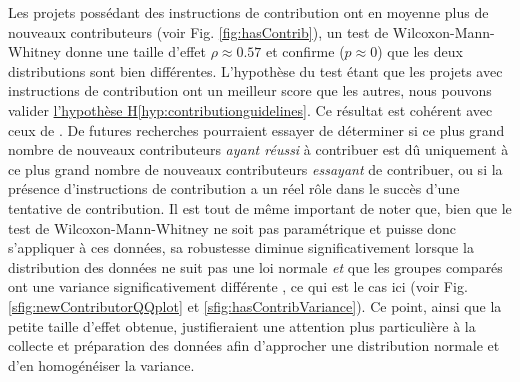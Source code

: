 \documentclass[dvipsnames,runningheads]{llncs}
\begin{document}
    Les projets possédant des instructions de contribution ont en moyenne plus de nouveaux contributeurs (voir
    Fig. \ref{fig:hasContrib}), un test de Wilcoxon-Mann-Whitney donne une taille d'effet $\rho \approx 0.57$
    et confirme ($p \approx 0$) que les deux distributions sont bien différentes. L'hypothèse du test étant
    que les projets avec instructions de contribution ont un meilleur score que les autres, nous pouvons
    valider \hyperref[hyp:contributionguidelines]{l'hypothèse H\ref*{hyp:contributionguidelines}}. Ce résultat
    est cohérent avec ceux de \textcite[p.~11]{signals-2019}. De futures recherches pourraient essayer de
    déterminer si ce plus grand nombre de nouveaux contributeurs \emph{ayant réussi} à contribuer est dû
    uniquement à ce plus grand nombre de nouveaux contributeurs \emph{essayant} de contribuer, ou si la
    présence d'instructions de contribution a un réel rôle dans le succès d'une tentative de contribution. Il
    est tout de même important de noter que, bien que le test de Wilcoxon-Mann-Whitney ne soit pas
    paramétrique et puisse donc s'appliquer à ces données, sa robustesse diminue significativement lorsque la
    distribution des données ne suit pas une loi normale \emph{et} que les groupes comparés ont une variance
    significativement différente \parencite{WMW-robustness-1998}, ce qui est le cas ici (voir Fig.
    \ref{sfig:newContributorQQplot} et \ref{sfig:hasContribVariance}). Ce point, ainsi que la petite taille
    d'effet obtenue, justifieraient une attention plus particulière à la collecte et préparation des données
    afin d'approcher une distribution normale et d'en homogénéiser la variance.
\end{document}
